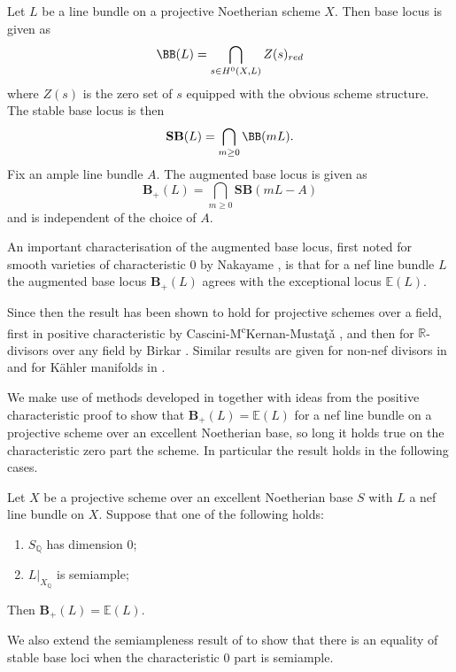 \documentclass[a4paper,12pt]{book}
\newcommand{\SB}{\mathbf{SB}}
\newcommand{\BS}{\mathbf{B}_{+}}
\begin{document}
	\begin{definition}
		Let $L$ be a line bundle on a projective Noetherian scheme $X$. Then base locus is given as 
		$$\BB(L)= \bigcap_{s \in H^{0}(X,L)} Z(s)_{red}$$
		where $Z(s)$ is the zero set of $s$ equipped with the obvious scheme structure. The stable base locus is then
		$$\SB(L)=\bigcap_{m \geq 0}\BB(mL).$$
		Fix an ample line bundle $A$. The augmented base locus is given as 
		$$\BS(L)=\bigcap_{m \geq 0}\SB(mL-A)$$
		and is independent of the choice of $A$.
		
	\end{definition} 
	
	An important characterisation of the augmented base locus, first noted for smooth varieties of characteristic $0$ by Nakayame \cite{nakamaye2000stable}, is that for a nef line bundle $L$ the augmented base locus $\BS(L)$ agrees with the exceptional locus $\mathbb{E}(L)$. 
	
	Since then the result has been shown to hold for projective schemes over a field, first in positive characteristic by Cascini-M\textsuperscript{c}Kernan-Musta\c{t}\v{a} \cite{cascini2014augmented}, and then for $\mathbb{R}$-divisors over any field by Birkar \cite{birkar2017augmented}. Similar results are given for non-nef divisors in \cite{ein2009restricted} and for K\"{a}hler manifolds in \cite{collins2015kahler}.
	
	We make use of methods developed in \cite{witaszek2020keel} together with ideas from the positive characteristic proof to show that $\BS(L)=\mathbb{E}(L)$ for a nef line bundle on a projective scheme over an excellent Noetherian base, so long it holds true on the characteristic zero part the scheme. In particular the result holds in the following cases.
	
	\begin{theorem}
		Let $X$ be a projective scheme over an excellent Noetherian base $S$ with $L$ a nef line bundle on $X$. 
		Suppose that one of the following holds:
		\begin{enumerate}
			\item $S_{\mathbb{Q}}$ has dimension $0$;
			\item $L|_{X_{\mathbb{Q}}}$ is semiample;
		\end{enumerate}
		
		Then $\BS(L)=\mathbb{E}(L)$.
	\end{theorem}
	
	We also extend the semiampleness result of \cite{witaszek2020keel} to show that there is an equality of stable base loci when the characteristic $0$ part is semiample.
	
\end{document}
